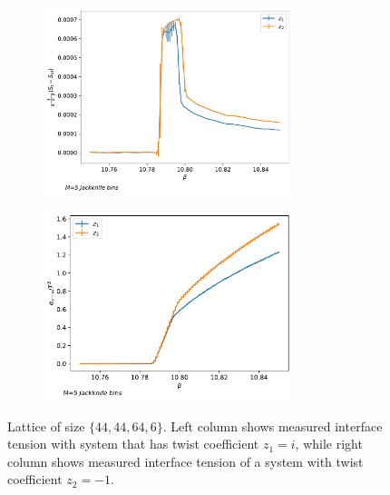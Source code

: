 \documentclass[english,twoside,openright]{UH_TCM_MSc}
\begin{document}
\begin{figure}[htb]
    \centering
    \begin{subfigure}[t]{\textwidth}
        \centering
        \includegraphics[width=0.8\textwidth]{final_plots/44_44_64/action_diff.pdf}
    \end{subfigure}
    \begin{subfigure}[t]{\textwidth}
        \centering
        \includegraphics[width=0.8\textwidth]{final_plots/44_44_64/action_diff_int.pdf}
    \end{subfigure}
    \caption{Lattice of size $\{44,44,64,6\}$. Left column shows measured interface tension with system that has twist coefficient $z_1 = i$, while right column shows measured interface tension of a system with twist coefficient $z_2 = -1$.} 
    \label{fig:4444646_twist_comparison}
\end{figure}
\end{document}

